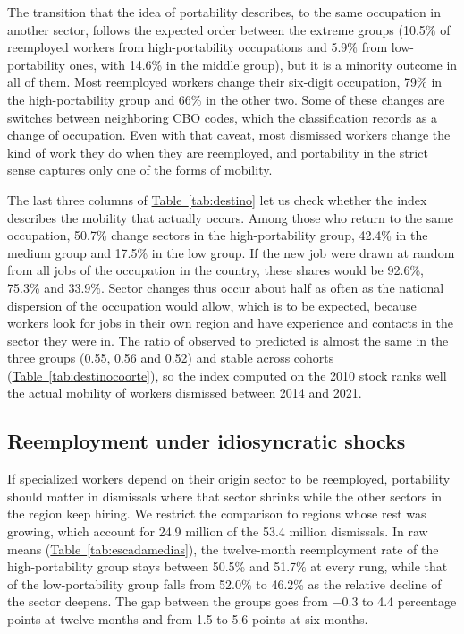\documentclass[11pt,a4paper]{article}
\begin{document}
The transition that the idea of portability describes, to the same occupation in another sector, follows the expected order between the extreme groups (10.5\% of reemployed workers from high-portability occupations and 5.9\% from low-portability ones, with 14.6\% in the middle group), but it is a minority outcome in all of them. Most reemployed workers change their six-digit occupation, 79\% in the high-portability group and 66\% in the other two. Some of these changes are switches between neighboring CBO codes, which the classification records as a change of occupation. Even with that caveat, most dismissed workers change the kind of work they do when they are reemployed, and portability in the strict sense captures only one of the forms of mobility.

The last three columns of \hyperref[tab:destino]{Table~\ref*{tab:destino}} let us check whether the index describes the mobility that actually occurs. Among those who return to the same occupation, 50.7\% change sectors in the high-portability group, 42.4\% in the medium group and 17.5\% in the low group. If the new job were drawn at random from all jobs of the occupation in the country, these shares would be 92.6\%, 75.3\% and 33.9\%. Sector changes thus occur about half as often as the national dispersion of the occupation would allow, which is to be expected, because workers look for jobs in their own region and have experience and contacts in the sector they were in. The ratio of observed to predicted is almost the same in the three groups (0.55, 0.56 and 0.52) and stable across cohorts (\hyperref[tab:destinocoorte]{Table~\ref*{tab:destinocoorte}}), so the index computed on the 2010 stock ranks well the actual mobility of workers dismissed between 2014 and 2021.

\subsection{Reemployment under idiosyncratic shocks}
\label{sec:escada}

If specialized workers depend on their origin sector to be reemployed, portability should matter in dismissals where that sector shrinks while the other sectors in the region keep hiring. We restrict the comparison to regions whose rest was growing, which account for 24.9 million of the 53.4 million dismissals. In raw means (\hyperref[tab:escadamedias]{Table~\ref*{tab:escadamedias}}), the twelve-month reemployment rate of the high-portability group stays between 50.5\% and 51.7\% at every rung, while that of the low-portability group falls from 52.0\% to 46.2\% as the relative decline of the sector deepens. The gap between the groups goes from $-0.3$ to 4.4 percentage points at twelve months and from 1.5 to 5.6 points at six months.
\end{document}
